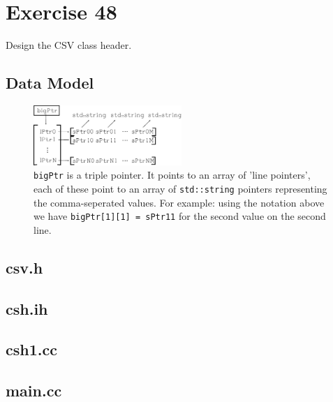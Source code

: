 \section{Exercise 48}
\begin{question}
Design the CSV class header.
\end{question}

\begin{solution}

    \subsection{Data Model}
    \begin{figure}[H]
        \centering
        \includegraphics[width=0.5\textwidth]{../48/images/datamodel.eps}
        \caption{\texttt{bigPtr} is a triple pointer. It points to an array of 'line pointers', each of these point to an array of \texttt{std::string} pointers representing the comma-seperated values. For example: using the notation above we have \texttt{bigPtr[1][1] = sPtr11} for the second value on the second line.}
    \end{figure}

    \subsection{csv.h}
    \subsection{csh.ih}
    \subsection{csh1.cc}
    \subsection{main.cc}
\end{solution}
